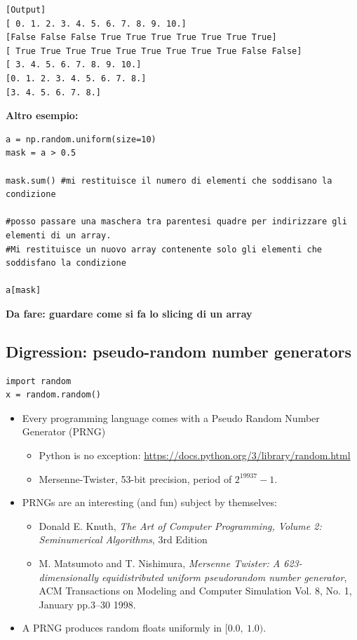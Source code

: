 \inputminted{python}{snippets/numpy_masks.py}
\begin{verbatim}
[Output]
[ 0. 1. 2. 3. 4. 5. 6. 7. 8. 9. 10.]
[False False False True True True True True True True]
[ True True True True True True True True True False False]
[ 3. 4. 5. 6. 7. 8. 9. 10.]
[0. 1. 2. 3. 4. 5. 6. 7. 8.]
[3. 4. 5. 6. 7. 8.]
\end{verbatim}

\textbf{Altro esempio:}

\begin{verbatim}
a = np.random.uniform(size=10)
mask = a > 0.5

mask.sum() #mi restituisce il numero di elementi che soddisano la condizione

#posso passare una maschera tra parentesi quadre per indirizzare gli elementi di un array.
#Mi restituisce un nuovo array contenente solo gli elementi che soddisfano la condizione

a[mask]
\end{verbatim} 


\textbf{Da fare: guardare come si fa lo slicing di un array}


\subsection{Digression: pseudo-random number generators}

\begin{verbatim}
import random
x = random.random()
\end{verbatim}

\begin{itemize}
  \item Every programming language comes with a Pseudo Random Number
    Generator (PRNG)
    \begin{itemize}
    \item Python is no exception:
      \url{https://docs.python.org/3/library/random.html}
    \item Mersenne-Twister, 53-bit precision, period of $2^{19937} - 1$. 
    \end{itemize}
  \item PRNGs are an interesting (and fun) subject by themselves:
    \begin{itemize}
    \item Donald E. Knuth, \emph{The Art of Computer Programming, Volume 2: Seminumerical Algorithms}, 3rd Edition 
    \item M. Matsumoto and T. Nishimura, \emph{Mersenne Twister: A 623-dimensionally equidistributed uniform pseudorandom number generator}, ACM Transactions on Modeling and Computer Simulation Vol. 8, No. 1, January pp.3--30 1998.
    \end{itemize}
  \item A PRNG produces random floats uniformly in $[0.0,~1.0)$.
  \end{itemize}
  
